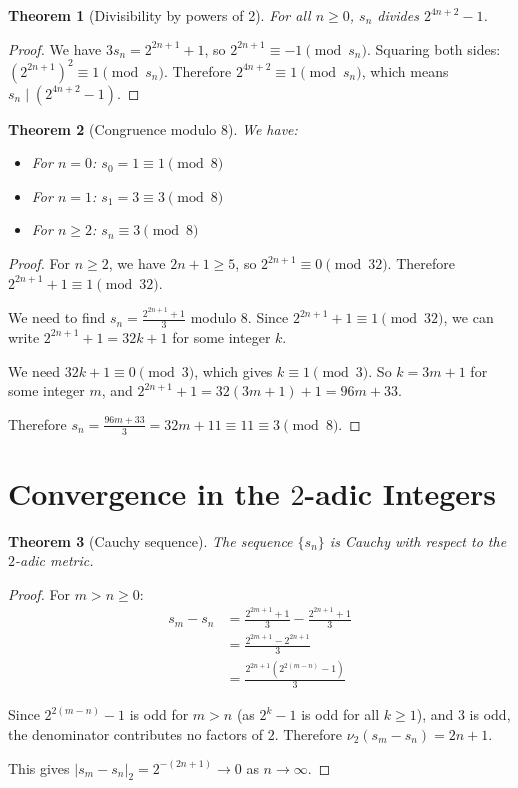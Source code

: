 \documentclass[11pt]{article}
\newtheorem{theorem}{Theorem}[section]
\theoremstyle{definition}
\begin{document}
\begin{theorem}[Divisibility by powers of 2]
For all $n \geq 0$, $s_n$ divides $2^{4n+2} - 1$.
\end{theorem}

\begin{proof}
We have $3s_n = 2^{2n+1} + 1$, so $2^{2n+1} \equiv -1 \pmod{s_n}$.
Squaring both sides: $(2^{2n+1})^2 \equiv 1 \pmod{s_n}$.
Therefore $2^{4n+2} \equiv 1 \pmod{s_n}$, which means $s_n \mid (2^{4n+2} - 1)$.
\end{proof}

\begin{theorem}[Congruence modulo 8]
We have:
\begin{itemize}
\item For $n = 0$: $s_0 = 1 \equiv 1 \pmod{8}$
\item For $n = 1$: $s_1 = 3 \equiv 3 \pmod{8}$
\item For $n \geq 2$: $s_n \equiv 3 \pmod{8}$
\end{itemize}
\end{theorem}

\begin{proof}
For $n \geq 2$, we have $2n + 1 \geq 5$, so $2^{2n+1} \equiv 0 \pmod{32}$.
Therefore $2^{2n+1} + 1 \equiv 1 \pmod{32}$.

We need to find $s_n = \frac{2^{2n+1} + 1}{3}$ modulo $8$.
Since $2^{2n+1} + 1 \equiv 1 \pmod{32}$, we can write $2^{2n+1} + 1 = 32k + 1$ for some integer $k$.

We need $32k + 1 \equiv 0 \pmod{3}$, which gives $k \equiv 1 \pmod{3}$.
So $k = 3m + 1$ for some integer $m$, and $2^{2n+1} + 1 = 32(3m + 1) + 1 = 96m + 33$.

Therefore $s_n = \frac{96m + 33}{3} = 32m + 11 \equiv 11 \equiv 3 \pmod{8}$.
\end{proof}

\section{Convergence in the $2$-adic Integers}

\begin{theorem}[Cauchy sequence]
The sequence $\{s_n\}$ is Cauchy with respect to the $2$-adic metric.
\end{theorem}

\begin{proof}
For $m > n \geq 0$:
\begin{align}
s_m - s_n &= \frac{2^{2m+1} + 1}{3} - \frac{2^{2n+1} + 1}{3}\\
&= \frac{2^{2m+1} - 2^{2n+1}}{3}\\
&= \frac{2^{2n+1}(2^{2(m-n)} - 1)}{3}
\end{align}

Since $2^{2(m-n)} - 1$ is odd for $m > n$ (as $2^k - 1$ is odd for all $k \geq 1$), and $3$ is odd, the denominator contributes no factors of $2$.
Therefore $\nu_2(s_m - s_n) = 2n + 1$.

This gives $|s_m - s_n|_2 = 2^{-(2n+1)} \to 0$ as $n \to \infty$.
\end{proof}
\end{document}
